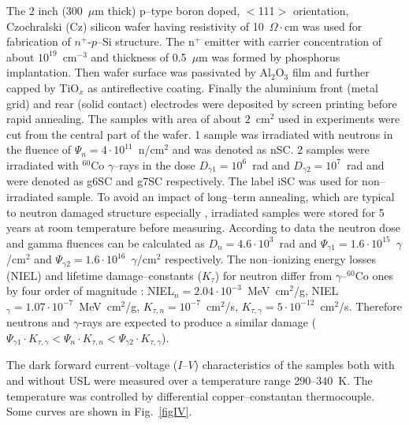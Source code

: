 \documentclass[aip,jap, amsmath,amssymb,reprint]{revtex4-1}
\begin{document}
The 2 inch (300~$\mu$m thick) p--type boron doped, $<$111$>$ orientation, Czochralski (Cz) silicon wafer having resistivity of 10~$\Omega\cdot$cm was used for fabrication of  $n^+$-$p$--Si structure.
The n$^+$ emitter with carrier concentration of about $10^{19}$~cm$^{-3}$ and thickness of 0.5~$\mu$m was formed by phosphorus implantation.
Then wafer surface was passivated by Al$_2$O$_3$ film and further capped by TiO$_x$ as antireflective coating.
Finally the aluminium front (metal grid) and rear (solid contact) electrodes were deposited by screen printing before rapid annealing.
The samples with area of about $2$~cm$^{2}$ used in experiments were cut from the central part of the wafer.
1 sample  was  irradiated  with  neutrons  in  the fluence  of $\Psi_n=4\cdot10^{11}$~n/cm$^2$  and was denoted as nSC.
2 samples were irradiated  with  $^{60}$Co $\gamma$--rays in the  dose  $D_{\gamma1}=10^6$~rad and $D_{\gamma2}=10^7$~rad and were denoted as g6SC and g7SC respectively.
The label iSC was used for non--irradiated sample.
To avoid an impact of  long--term annealing, which are typical to neutron damaged structure especially \cite{NIEL:Moll,Rew:Srour}, irradiated samples were stored  for  5 years  at  room  temperature before measuring.
According to data \cite{NIEL:Akkerman,Brauning} the neutron dose and gamma fluences can be calculated as $D_n=4.6\cdot10^3$~rad and $\Psi_{\gamma1}=1.6\cdot10^{15}$~$\gamma$/cm$^2$ and $\Psi_{\gamma2}=1.6\cdot10^{16}$~$\gamma$/cm$^2$ respectively.
The non--ionizing energy losses (NIEL) and lifetime damage--constants ($K_\tau$) for neutron
differ from $\gamma$--$^{60}$Co ones by four order of magnitude \cite{NIEL:Akkerman,NIEL:Jafari}:
NIEL$_n=2.04\cdot10^{-3}$~MeV~cm$^2$/g, NIEL$_\gamma=1.07\cdot10^{-7}$~MeV~cm$^2$/g, $K_{\tau,n}=10^{-7}$~cm$^2$/s, $K_{\tau,\gamma}=5\cdot10^{-12}$~cm$^2$/s.
Therefore neutrons and $\gamma$-rays are expected to produce a similar damage ($\Psi_{\gamma1}\cdot K_{\tau,\gamma}<\Psi_{n}\cdot K_{\tau,n}<\Psi_{\gamma2}\cdot K_{\tau,\gamma}$).


The dark forward current--voltage ($I$--$V$) characteristics of the samples both with and without USL were measured over a temperature range 290--340~K.
The temperature was controlled by differential copper--constantan thermocouple.
Some curves are shown in Fig.~\ref{figIV}.
\end{document}
